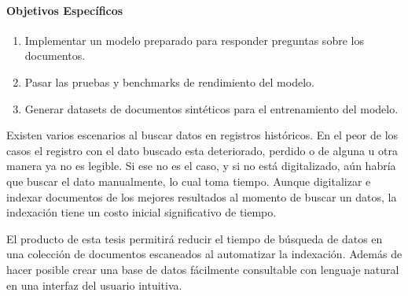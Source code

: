\documentclass[../main.tex]{subfiles}
\begin{document}
\paragraph{Objetivos Específicos}

\begin{enumerate}
    \item Implementar un modelo preparado para responder preguntas sobre los documentos.
    \item Pasar las pruebas y benchmarks de rendimiento del modelo.
    \item Generar datasets de documentos sintéticos para el entrenamiento del modelo.
\end{enumerate}

%


Existen varios escenarios al buscar datos en registros históricos.
En el peor de los casos el registro con el dato buscado esta deteriorado, perdido o de alguna u otra manera ya no es legible.
Si ese no es el caso, y si no está digitalizado, aún habría que buscar el dato manualmente, lo cual toma tiempo.
Aunque digitalizar e indexar documentos de los mejores resultados al momento de buscar un datos, la indexación 
tiene un costo inicial significativo de tiempo.

El producto de esta tesis permitirá reducir el tiempo de búsqueda de datos en una
colección de documentos escaneados al automatizar la indexación.
Además de hacer posible crear una base de datos fácilmente consultable con lenguaje natural en una interfaz del usuario intuitiva.
\end{document}
